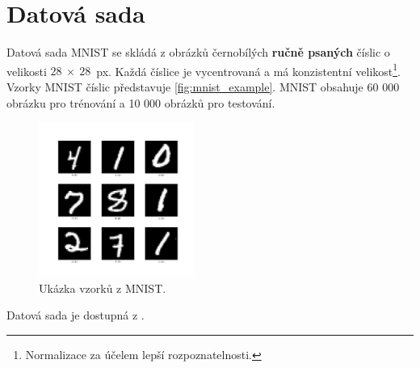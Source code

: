 \section{Datová sada}
Datová sada MNIST se skládá z obrázků černobílých \textbf{ručně psaných} číslic o velikosti $28~\times~28$~px.
Každá číslice je vycentrovaná a má konzistentní velikost\footnote{Normalizace za účelem lepší rozpoznatelnosti.}.
Vzorky MNIST číslic představuje \autoref{fig:mnist_example}.
MNIST obsahuje 60 000 obrázku pro trénování a 10 000 obrázků pro testování.

\begin{figure}[H]
    \centering
    \includegraphics[width=0.45\textwidth]{figures/mnist_example.png}
    \caption{Ukázka vzorků z MNIST.}
    \label{fig:mnist_example}
\end{figure}

Datová sada je dostupná z \textcite{LeCun2010}.
